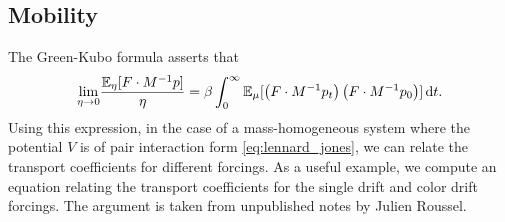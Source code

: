 \subsection{Mobility}
The Green-Kubo formula asserts that
\begin{equation}
    \label{eq:green_kubo_mobility}
    \underset{\eta\to 0}{\lim} \frac{\mathbb{E}_\eta[F\cdot M^{-1}p]}{\eta}=\beta \int_{0}^\infty \mathbb{E}_\mu[\left(F\cdot M^{-1}p_t\right)\left(F\cdot M^{-1}p_0\right)]\,\mathrm{d} t.
\end{equation}
Using this expression, in the case of a mass-homogeneous system where the potential $V$ is of pair interaction form \eqref{eq:lennard_jones}, we can relate the transport coefficients for different forcings.
As a useful example, we compute an equation relating the transport coefficients for the single drift and color drift forcings. The argument is taken from unpublished notes by Julien Roussel.
